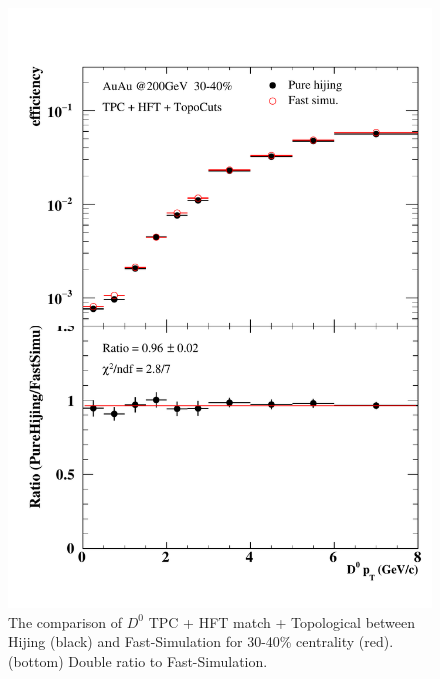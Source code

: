 \begin{figure}[htbp]
\begin{minipage}[htbp]{0.47\linewidth}
\centering
\includegraphics[width=1.0\textwidth,angle=0]{figure/Run14_D0HFT/30_40_2.pdf}
\caption{ The comparison of $D^0$ TPC + HFT match + Topological between Hijing (black) and Fast-Simulation for 30-40\% centrality (red). (bottom) Double ratio to Fast-Simulation.\label{30_40}}
\end{minipage}
\hfill
\begin{minipage}[htbp]{0.47\linewidth}
\centering

\end{minipage}
\end{figure}
